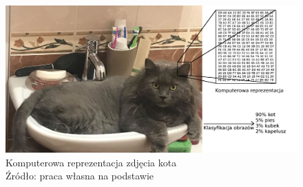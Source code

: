 \begin{figure}[h!tb]
	 \centering
	 \includegraphics[width = 1.0\linewidth]{img/kot}
	 \caption{Komputerowa reprezentacja zdjęcia kota \\
              Źródło: praca własna na podstawie \cite{cs231n}}
	 \label{fig:image_classification}
\end{figure}


